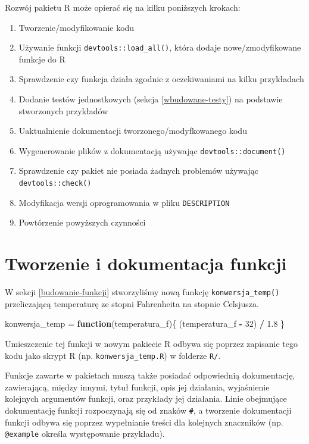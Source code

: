 \documentclass[paper=6in:9in,pagesize=pdftex,headinclude=on,footinclude=on,10pt]{scrbook}
\newenvironment{Shaded}{\begin{snugshade}}{\end{snugshade}}
\newcommand{\ControlFlowTok}[1]{\textcolor[rgb]{0.13,0.29,0.53}{\textbf{#1}}}
\newcommand{\DecValTok}[1]{\textcolor[rgb]{0.00,0.00,0.81}{#1}}
\newcommand{\FloatTok}[1]{\textcolor[rgb]{0.00,0.00,0.81}{#1}}
\newcommand{\NormalTok}[1]{#1}
\newcommand{\OperatorTok}[1]{\textcolor[rgb]{0.81,0.36,0.00}{\textbf{#1}}}
\newcommand{\StringTok}[1]{\textcolor[rgb]{0.31,0.60,0.02}{#1}}
\providecommand{\tightlist}{%
  \setlength{\itemsep}{0pt}\setlength{\parskip}{0pt}}
\begin{document}
Rozwój pakietu R może opierać się na kilku poniższych krokach:

\begin{enumerate}
\def\labelenumi{\arabic{enumi}.}
\tightlist
\item
  Tworzenie/modyfikowanie kodu
\item
  Używanie funkcji \texttt{devtools::load\_all()}, która dodaje nowe/zmodyfikowane funkcje do R
\item
  Sprawdzenie czy funkcja działa zgodnie z oczekiwaniami na kilku przykładach
\item
  Dodanie testów jednostkowych (sekcja \ref{wbudowane-testy}) na podstawie stworzonych przykładów
\item
  Uaktualnienie dokumentacji tworzonego/modyfkowanego kodu
\item
  Wygenerowanie plików z dokumentacją używając \texttt{devtools::document()}
\item
  Sprawdzenie czy pakiet nie posiada żadnych problemów używając \texttt{devtools::check()}
\item
  Modyfikacja wersji oprogramowania w pliku \texttt{DESCRIPTION}
\item
  Powtórzenie powyższych czynności
\end{enumerate}

\hypertarget{tworzenie-i-dokumentacja-funkcji}{%
\section{Tworzenie i dokumentacja funkcji}\label{tworzenie-i-dokumentacja-funkcji}}

W sekcji \ref{budowanie-funkcji} stworzyliśmy nową funkcję \texttt{konwersja\_temp()} przeliczającą temperaturę ze stopni Fahrenheita na stopnie Celsjusza.

\begin{Shaded}
\begin{Highlighting}[]
\NormalTok{konwersja_temp =}\StringTok{ }\ControlFlowTok{function}\NormalTok{(temperatura_f)\{}
\NormalTok{    (temperatura_f }\OperatorTok{-}\StringTok{ }\DecValTok{32}\NormalTok{) }\OperatorTok{/}\StringTok{ }\FloatTok{1.8}
\NormalTok{\}}
\end{Highlighting}
\end{Shaded}

Umieszczenie tej funkcji w nowym pakiecie R odbywa się poprzez zapisanie tego kodu jako skrypt R (np. \texttt{konwersja\_temp.R}) w folderze \texttt{R/}.

Funkcje zawarte w pakietach muszą także posiadać odpowiednią dokumentację, zawierającą, między innymi, tytuł funkcji, opis jej działania, wyjaśnienie kolejnych argumentów funkcji, oraz przykłady jej działania.
Linie obejmujące dokumentację funkcji rozpoczynają się od znaków \texttt{\#\textquotesingle{}}, a tworzenie dokumentacji funkcji odbywa się poprzez wypełnianie treści dla kolejnych znaczników (np. \texttt{@example} określa występowanie przykładu).
\end{document}

